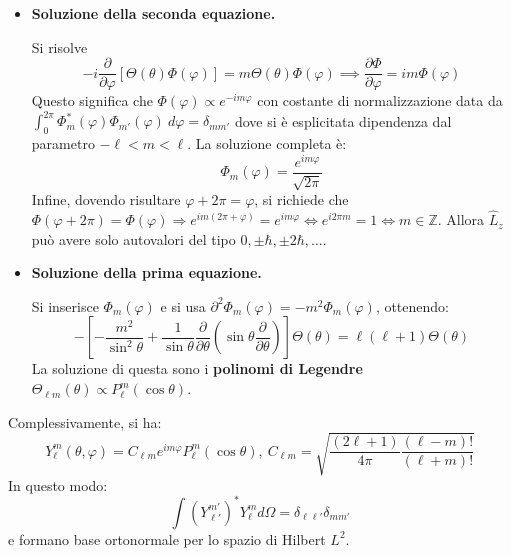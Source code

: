 \documentclass[10pt, a4paper]{scrartcl}
\numberwithin{equation}{subsection}
\theoremstyle{style1}
\begin{document}
\begin{itemize}
	\item \textbf{Soluzione della seconda equazione.} 

		Si risolve 
		\[
		-i \frac{\partial }{\partial \varphi } \left[ \Theta(\theta ) \Phi(\varphi ) \right] = m \Theta(\theta ) \Phi(\varphi ) \implies \frac{\partial \Phi}{\partial \varphi } = im \Phi (\varphi )
		\] 
		Questo significa che $\Phi(\varphi ) \propto e^{-im\varphi } $ con costante di normalizzazione data da $\int_{0} ^{2\pi} \Phi_m^*(\varphi ) \Phi_{m'} (\varphi ) \ d\varphi = \delta _{m m '} $ dove si \`e esplicitata dipendenza dal parametro $-\ell <m <\ell $. La soluzione completa \`e:
		\begin{equation}
			\Phi_m(\varphi ) = \frac{e^{im\varphi } }{\sqrt{2\pi} }
		\end{equation}
		Infine, dovendo risultare $\varphi  +2\pi = \varphi $, si richiede che $\Phi (\varphi + 2\pi ) = \Phi(\varphi ) \Rightarrow e^{im (2\pi + \varphi ) } = e^{im\varphi } \iff e^{i 2\pi m} = 1 \iff m \in \mathbb{Z}$. Allora $\hat{L}_z$ pu\`o avere solo autovalori del tipo $0, \pm\hbar , \pm 2 \hbar , \ldots$.
	\item \textbf{Soluzione della prima equazione.} 

		Si inserisce $\Phi_m(\varphi )$ e si usa $\partial^2 \Phi_m(\varphi ) =-m^2 \Phi_m(\varphi) $, ottenendo:
		\[
		- \left[ - \frac{m^2}{\sin^ 2 \theta } + \frac{1}{\sin\theta } \frac{\partial }{\partial \theta } \left(\sin \theta \frac{\partial }{\partial \theta } \right)  \right] \Theta(\theta ) = \ell (\ell +1) \Theta(\theta )
		\] 
		La soluzione di questa sono i \textbf{polinomi di Legendre} $\Theta_{\ell m} (\theta ) \propto P^m_\ell (\cos \theta ) $.
\end{itemize}
Complessivamente, si ha:
\begin{equation}
	Y^m_\ell (\theta ,\varphi ) = C_{\ell m}  e^{im \varphi } P^m_\ell (\cos \theta ), \ C_{\ell m} = \sqrt{\frac{(2\ell +1)}{4\pi} \frac{(\ell -m)!}{(\ell +m)!}} 
\end{equation}
In questo modo:
\[
\int (Y^{m'} _{\ell '} )^* Y^m_\ell  d \Omega  = \delta _{\ell \ell '} \delta _{m m'} 
\] 
e formano base ortonormale per lo spazio di Hilbert $L^2$.
\end{document}
